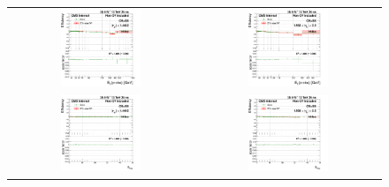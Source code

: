 \begin{figure}[bh]
  \begin{center}
    \begin{tabular}{cc}
      \includegraphics[width=0.45\textwidth]{figures/Zprime/2016/ScaleFactor/SameSign/N_1_eff/g_compare_cut_Et_Barrel_ea_ta_inc_AS_N_1_TrkIso_PUW.png} &
      \includegraphics[width=0.45\textwidth]{figures/Zprime/2016/ScaleFactor/SameSign/N_1_eff/g_compare_cut_Et_Endcap_ea_ta_inc_AS_N_1_TrkIso_PUW.png} \\
      \includegraphics[width=0.45\textwidth]{figures/Zprime/2016/ScaleFactor/SameSign/N_1_eff/g_compare_cut_nVtx_Barrel_ea_ta_inc_AS_N_1_TrkIso_PUW.png} &
      \includegraphics[width=0.45\textwidth]{figures/Zprime/2016/ScaleFactor/SameSign/N_1_eff/g_compare_cut_nVtx_Endcap_ea_ta_inc_AS_N_1_TrkIso_PUW.png} \\

\end{tabular}
\end{center}
\end{figure}
